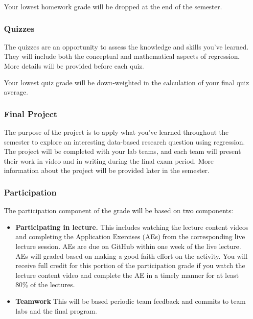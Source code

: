 \documentclass[
]{article}
\begin{document}
Your lowest homework grade will be dropped at the end of the semester.

\hypertarget{quizzes}{%
\subsubsection{Quizzes}\label{quizzes}}

The quizzes are an opportunity to assess the knowledge and skills you've
learned. They will include both the conceptual and mathematical aspects
of regression. More details will be provided before each quiz.

Your lowest quiz grade will be down-weighted in the calculation of your
final quiz average.

\hypertarget{final-project}{%
\subsubsection{Final Project}\label{final-project}}

The purpose of the project is to apply what you've learned throughout
the semester to explore an interesting data-based research question
using regression. The project will be completed with your lab teams, and
each team will present their work in video and in writing during the
final exam period. More information about the project will be provided
later in the semester.

\hypertarget{participation}{%
\subsubsection{Participation}\label{participation}}

The participation component of the grade will be based on two
components:

\begin{itemize}
\item
  \textbf{Participating in lecture.} This includes watching the lecture
  content videos and completing the Application Exercises (AEs) from the
  corresponding live lecture session. AEs are due on GitHub within one
  week of the live lecture. AEs will graded based on making a good-faith
  effort on the activity. You will receive full credit for this portion
  of the participation grade if you watch the lecture content video and
  complete the AE in a timely manner for at least 80\% of the lectures.
\item
  \textbf{Teamwork} This will be based periodic team feedback and
  commits to team labs and the final program.
\end{itemize}
\end{document}
